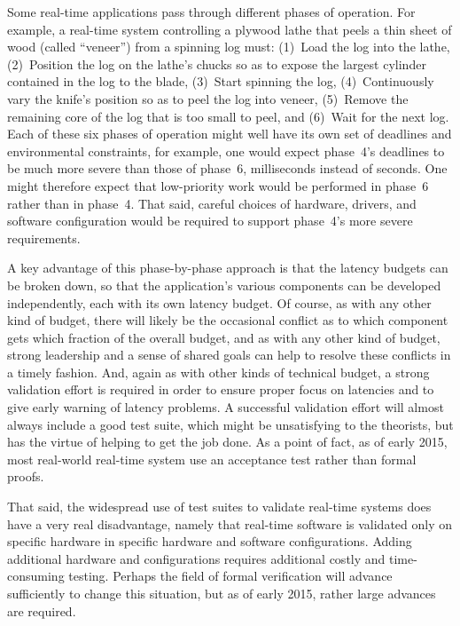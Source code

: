 Some real-time applications pass through different phases of operation.
For example, a real-time system controlling a plywood lathe that peels
a thin sheet of wood (called ``veneer'') from a spinning log must:
(1)~Load the log into the lathe,
(2)~Position the log on the lathe's chucks so as to expose the largest
cylinder contained in the log to the blade,
(3)~Start spinning the log,
(4)~Continuously vary the knife's position so as to peel the log into veneer,
(5)~Remove the remaining core of the log that is too small to peel, and
(6)~Wait for the next log.
Each of these six phases of operation might well have its own set of
deadlines and environmental constraints,
for example, one would expect phase~4's deadlines to be much more severe
than those of phase~6, milliseconds instead of seconds.
One might therefore expect that low-priority work would be performed in
phase~6 rather than in phase~4.
That said, careful choices of hardware, drivers, and software configuration
would be required to support phase~4's more severe requirements.

A key advantage of this phase-by-phase approach is that the latency
budgets can be broken down, so that the application's various components
can be developed independently, each with its own latency budget.
Of course, as with any other kind of budget, there will likely be the
occasional conflict as to which component gets which fraction of the
overall budget, and as with any other kind of budget, strong leadership
and a sense of shared goals can help to resolve these conflicts in
a timely fashion.
And, again as with other kinds of technical budget, a strong validation
effort is required in order to ensure proper focus on latencies and to
give early warning of latency problems.
A successful validation effort will almost always include a good test
suite, which might be unsatisfying to the theorists, but has the virtue
of helping to get the job done.
As a point of fact, as of early 2015, most real-world real-time system
use an acceptance test rather than formal proofs.

That said, the widespread use of test suites to validate real-time systems
does have a very real disadvantage, namely that real-time software is
validated only on specific hardware in specific hardware and software
configurations.
Adding additional hardware and configurations requires additional costly and
time-consuming testing.
Perhaps the field of formal verification will advance sufficiently to
change this situation, but as of early 2015, rather
large advances are required.

